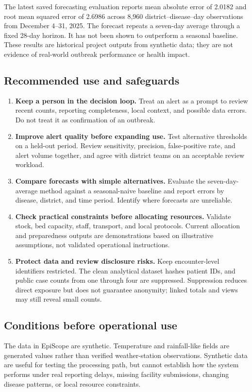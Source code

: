 The latest saved forecasting evaluation reports mean absolute error of 2.0182 and root mean squared error of 2.6986 across 8,960 district--disease--day observations from December 4--31, 2025. The forecast repeats a seven-day average through a fixed 28-day horizon. It has not been shown to outperform a seasonal baseline. These results are historical project outputs from synthetic data; they are not evidence of real-world outbreak performance or health impact.

\clearpage
\subsection*{Recommended use and safeguards}
\begin{enumerate}
    \item \textbf{Keep a person in the decision loop.} Treat an alert as a prompt to review recent counts, reporting completeness, local context, and possible data errors. Do not treat it as confirmation of an outbreak.
    \item \textbf{Improve alert quality before expanding use.} Test alternative thresholds on a held-out period. Review sensitivity, precision, false-positive rate, and alert volume together, and agree with district teams on an acceptable review workload.
    \item \textbf{Compare forecasts with simple alternatives.} Evaluate the seven-day-average method against a seasonal-naive baseline and report errors by disease, district, and time period. Identify where forecasts are unreliable.
    \item \textbf{Check practical constraints before allocating resources.} Validate stock, bed capacity, staff, transport, and local protocols. Current allocation and preparedness outputs are demonstrations based on illustrative assumptions, not validated operational instructions.
    \item \textbf{Protect data and review disclosure risks.} Keep encounter-level identifiers restricted. The clean analytical dataset hashes patient IDs, and public case counts from one through four are suppressed. Suppression reduces direct exposure but does not guarantee anonymity; linked totals and views may still reveal small counts.
\end{enumerate}

\subsection*{Conditions before operational use}
The data in EpiScope are synthetic. Temperature and rainfall-like fields are generated values rather than verified weather-station observations. Synthetic data are useful for testing the processing path, but cannot establish how the system performs under real reporting delays, missing facility submissions, changing disease patterns, or local resource constraints.

